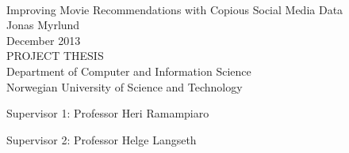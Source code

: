 \thispagestyle{empty}
\mbox{}\\[6pc]
\begin{center}
\Huge{Improving Movie Recommendations with Copious Social Media Data}\\[2pc]

\Large{Jonas Myrlund}\\[1pc]
\large{December 2013}\\[2pc]

PROJECT THESIS\\
Department of Computer and Information Science\\
Norwegian University of Science and Technology
\end{center}
\vfill

\noindent Supervisor 1: Professor Heri Ramampiaro

\noindent Supervisor 2: Professor Helge Langseth

